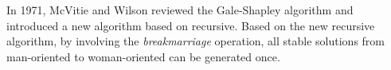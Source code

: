 In 1971, McVitie and Wilson \cite{McVitie&Wilson} reviewed the Gale-Shapley algorithm and introduced a new algorithm based on recursive. 
Based on the new recursive algorithm, by involving the {\it breakmarriage} operation, all stable solutions from man-oriented to woman-oriented can be generated once.

